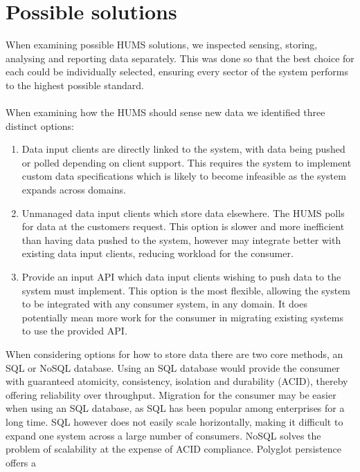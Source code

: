\documentclass[10pt,a4paper]{article}
\begin{document}






\section{Possible solutions}
When examining possible HUMS solutions, we inspected sensing, storing, analysing
and reporting data separately. This was done so that the best choice for each
could be individually selected, ensuring every sector of the system performs to
the highest possible standard. 
\\ \\
When examining how the HUMS should sense new data we identified three distinct
options:
\begin{enumerate}
\item Data input clients are directly linked to the system, with data being
pushed or polled depending on client support. This requires the system to
implement custom data specifications which is likely to become infeasible as the
system expands across domains.
\item Unmanaged data input clients which store data elsewhere. The HUMS polls
for data at the customers request. This option is slower and more inefficient
than having data pushed to the system, however may integrate better with
existing data input clients, reducing workload for the consumer.
\item Provide an input API which data input clients wishing to push data to the
system must implement. This option is the most flexible, allowing the system to
be integrated with any consumer system, in any domain. It does potentially mean
more work for the consumer in migrating existing systems to use the provided
API. \\
\end{enumerate}
When considering options for how to store data there are two core methods, an
SQL or NoSQL database. Using an SQL database would provide the consumer with
guaranteed atomicity, consistency, isolation and durability (ACID), thereby
offering reliability over throughput. Migration for the consumer may be easier
when using an SQL database, as SQL has been popular among enterprises for a long
time. SQL however does not easily scale horizontally, making it difficult to
expand one system across a large number of consumers. NoSQL solves the problem
of scalability at the expense of ACID compliance. Polyglot persistence offers a
\end{document}

